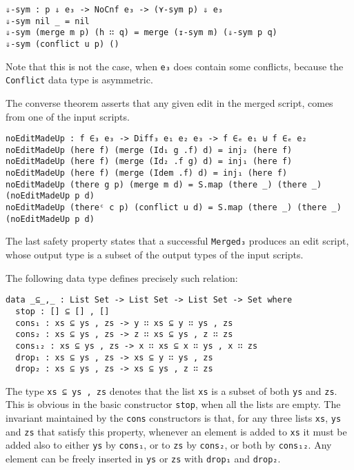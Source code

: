 \documentclass[../Thesis.tex]{subfiles}
\begin{document}
\begin{verbatim}
⇓-sym : p ⇓ e₃ -> NoCnf e₃ -> (⋎-sym p) ⇓ e₃
⇓-sym nil _ = nil
⇓-sym (merge m p) (h ∷ q) = merge (↧-sym m) (⇓-sym p q)
⇓-sym (conflict u p) ()
\end{verbatim}	
	Note that this is not the case, when \texttt{e₃} does contain some conflicts,
	because the \texttt{Conflict} data type is asymmetric.
		
	The converse theorem asserts that any given edit in the merged script,
	comes from one of the input scripts.
	
\begin{verbatim}
noEditMadeUp : f ∈₃ e₃ -> Diff₃ e₁ e₂ e₃ -> f ∈ₑ e₁ ⊎ f ∈ₑ e₂
noEditMadeUp (here f) (merge (Id₁ g .f) d) = inj₂ (here f)
noEditMadeUp (here f) (merge (Id₂ .f g) d) = inj₁ (here f)
noEditMadeUp (here f) (merge (Idem .f) d) = inj₁ (here f)
noEditMadeUp (there g p) (merge m d) = S.map (there _) (there _) (noEditMadeUp p d)
noEditMadeUp (thereᶜ c p) (conflict u d) = S.map (there _) (there _) (noEditMadeUp p d)
\end{verbatim}

	The last safety property states that a successful \texttt{Merged₃}
	produces an edit script, whose output type is a subset of the output
	types of the input scripts.
	
	The following data type defines precisely such relation:

\begin{verbatim}
data _⊆_,_ : List Set -> List Set -> List Set -> Set where
  stop : [] ⊆ [] , []
  cons₁ : xs ⊆ ys , zs -> y ∷ xs ⊆ y ∷ ys , zs
  cons₂ : xs ⊆ ys , zs -> z ∷ xs ⊆ ys , z ∷ zs
  cons₁₂ : xs ⊆ ys , zs -> x ∷ xs ⊆ x ∷ ys , x ∷ zs
  drop₁ : xs ⊆ ys , zs -> xs ⊆ y ∷ ys , zs
  drop₂ : xs ⊆ ys , zs -> xs ⊆ ys , z ∷ zs
\end{verbatim}

	The type \texttt{xs ⊆ ys , zs} denotes that the list \texttt{xs} is a subset
	of both \texttt{ys} and \texttt{zs}.
	This is obvious in the basic constructor \texttt{stop}, when all
	the lists are empty.
	The invariant maintained by the \texttt{cons} constructors is that, for any
	three lists \texttt{xs}, \texttt{ys} and \texttt{zs} that satisfy this property,
	 whenever an element is added to \texttt{xs} it must be added also 
	to either \texttt{ys} by \texttt{cons₁}, or  to \texttt{zs} by \texttt{cons₂},
	or both by \texttt{cons₁₂}.
	Any element can be freely inserted in \texttt{ys} or \texttt{zs} with 
	\texttt{drop₁} and \texttt{drop₂}.
	
\end{document}
